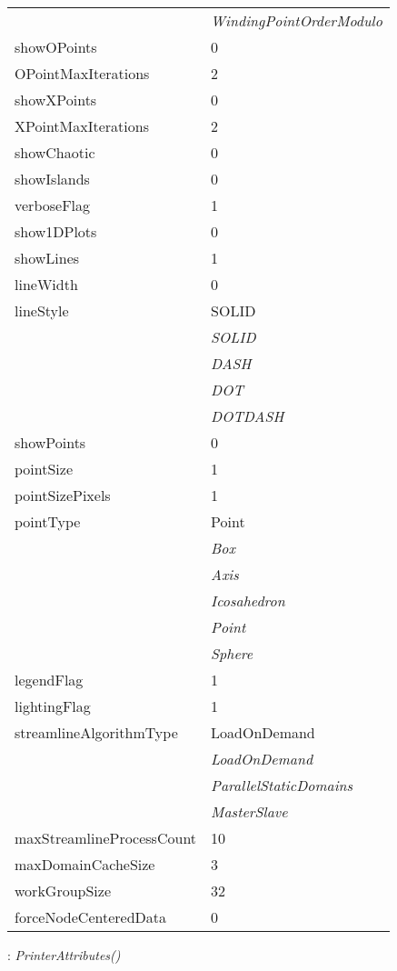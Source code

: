 \documentclass[10pt,a4paper]{report}
\begin{document}
\begin{longtable}{ll}
 & {\it  WindingPointOrderModulo} \\
showOPoints  &  0 \\
OPointMaxIterations  &  2 \\
showXPoints  &  0 \\
XPointMaxIterations  &  2 \\
showChaotic  &  0 \\
showIslands  &  0 \\
verboseFlag  &  1 \\
show1DPlots  &  0 \\
showLines  &  1 \\
lineWidth  &  0 \\
lineStyle  &  SOLID   \\
 & {\it  SOLID} \\
 & {\it  DASH} \\
 & {\it  DOT} \\
 & {\it  DOTDASH} \\
showPoints  &  0 \\
pointSize  &  1 \\
pointSizePixels  &  1 \\
pointType  &  Point   \\
 & {\it  Box} \\
 & {\it  Axis} \\
 & {\it  Icosahedron} \\
 & {\it  Point} \\
 & {\it  Sphere} \\
legendFlag  &  1 \\
lightingFlag  &  1 \\
streamlineAlgorithmType  &  LoadOnDemand   \\
 & {\it  LoadOnDemand} \\
 & {\it  ParallelStaticDomains} \\
 & {\it  MasterSlave} \\
maxStreamlineProcessCount  &  10 \\
maxDomainCacheSize  &  3 \\
workGroupSize  &  32 \\
forceNodeCenteredData  &  0 \\
\end{longtable}

\newpage

{}
: {\it PrinterAttributes() }\\[-3mm]
\end{document}

